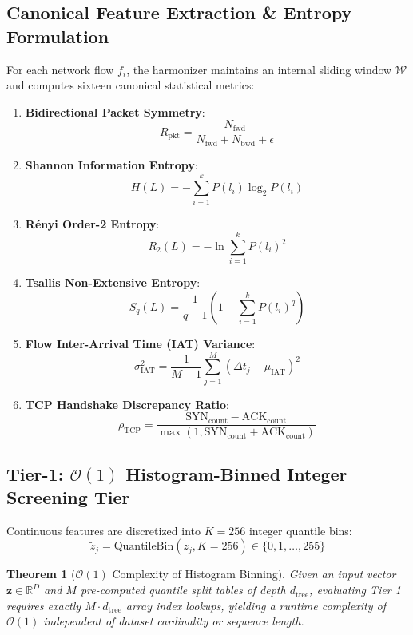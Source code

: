 \documentclass[journal]{IEEEtran}
\newtheorem{theorem}{Theorem}
\begin{document}
\subsection{Canonical Feature Extraction \& Entropy Formulation}
For each network flow $f_i$, the harmonizer maintains an internal sliding window $\mathcal{W}$ and computes sixteen canonical statistical metrics:
\begin{enumerate}
    \item \textbf{Bidirectional Packet Symmetry}:
    \begin{equation}
    R_{\text{pkt}} = \frac{N_{\text{fwd}}}{N_{\text{fwd}} + N_{\text{bwd}} + \epsilon}
    \end{equation}
    \item \textbf{Shannon Information Entropy}:
    \begin{equation}
    H(L) = -\sum_{i=1}^k P(l_i) \log_2 P(l_i)
    \end{equation}
    \item \textbf{Rényi Order-2 Entropy}:
    \begin{equation}
    R_2(L) = -\ln \sum_{i=1}^k P(l_i)^2
    \end{equation}
    \item \textbf{Tsallis Non-Extensive Entropy}:
    \begin{equation}
    S_q(L) = \frac{1}{q-1} \left(1 - \sum_{i=1}^k P(l_i)^q\right)
    \end{equation}
    \item \textbf{Flow Inter-Arrival Time (IAT) Variance}:
    \begin{equation}
    \sigma_{\text{IAT}}^2 = \frac{1}{M-1} \sum_{j=1}^M (\Delta t_j - \mu_{\text{IAT}})^2
    \end{equation}
    \item \textbf{TCP Handshake Discrepancy Ratio}:
    \begin{equation}
    \rho_{\text{TCP}} = \frac{\text{SYN}_{\text{count}} - \text{ACK}_{\text{count}}}{\max(1, \text{SYN}_{\text{count}} + \text{ACK}_{\text{count}})}
    \end{equation}
\end{enumerate}

\subsection{Tier-1: $\mathcal{O}(1)$ Histogram-Binned Integer Screening Tier}
Continuous features are discretized into $K=256$ integer quantile bins:
\begin{equation}
\tilde{z}_j = \text{QuantileBin}(z_j, K=256) \in \{0, 1, \dots, 255\}
\end{equation}
\begin{theorem}[$\mathcal{O}(1)$ Complexity of Histogram Binning]
Given an input vector $\mathbf{z} \in \mathbb{R}^D$ and $M$ pre-computed quantile split tables of depth $d_{\text{tree}}$, evaluating Tier 1 requires exactly $M \cdot d_{\text{tree}}$ array index lookups, yielding a runtime complexity of $\mathcal{O}(1)$ independent of dataset cardinality or sequence length.
\end{theorem}
\end{document}
